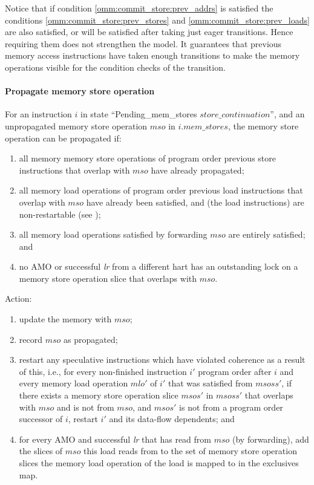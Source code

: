 \begin{commentary}
Notice that if condition \ref{omm:commit_store:prev_addrs} is satisfied the conditions \ref{omm:commit_store:prev_stores} and \ref{omm:commit_store:prev_loads} are also satisfied, or will be satisfied after taking just eager transitions.
Hence requiring them does not strengthen the model.
It guarantees that previous memory access instructions have taken enough transitions to make the memory operations visible for the condition checks of the  transition.
\end{commentary}


\paragraph{Propagate memory store operation}\label{omm:hart:prop_mem_write}
For an instruction $i$ in state ``{\sc Pending\_mem\_stores} $store\_continuation$'', and an unpropagated memory store operation $mso$ in $i.mem\_stores$, the memory store operation can be propagated if:
\begin{enumerate}
\item all memory memory store operations of program order previous store instructions that overlap with $mso$ have already propagated;
\item all memory load operations of program order previous load instructions that overlap with $mso$ have already been satisfied, and (the load instructions) are non-restartable (see );
\item all memory load operations satisfied by forwarding $mso$ are entirely satisfied; and
\item no AMO or successful {\em lr} from a different hart has an outstanding lock on a memory store operation slice that overlaps with $mso$.
\end{enumerate}
Action:
\begin{enumerate}
\item update the memory with $mso$;
\item record $mso$ as propagated;
\item restart any speculative instructions which have violated coherence as a result of this, i.e., for every non-finished instruction $i'$ program order after $i$ and every memory load operation $mlo'$ of $i'$ that was satisfied from $msoss'$, if there exists a memory store operation slice $msos'$ in $msoss'$ that overlaps with $mso$ and is not from $mso$, and $msos'$ is not from a program order successor of $i$, restart $i'$ and its data-flow dependents; and
\item for every AMO and successful {\em lr} that has read from $mso$ (by forwarding), add the slices of $mso$ this load reads from to the set of memory store operation slices the memory load operation of the load is mapped to in the exclusives map.
\end{enumerate}

